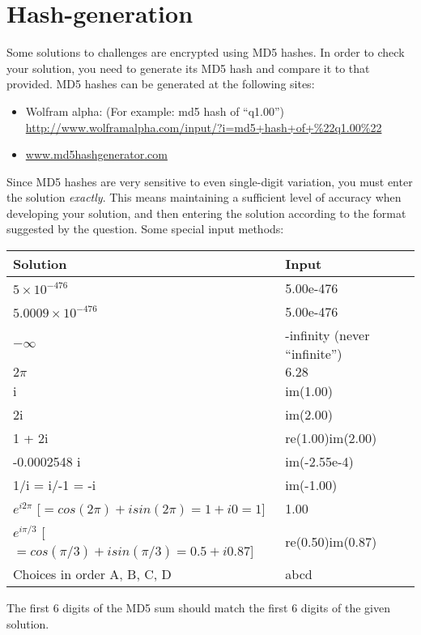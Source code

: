 \newpage
\section{Hash-generation}
\label{sec:hashes}

Some solutions to challenges are encrypted using MD5 hashes. In order to check your solution, you need to generate its MD5 hash and compare it to that provided. MD5 hashes can be generated at the following sites:

\begin{itemize}
    \item Wolfram alpha: (For example: md5 hash of ``q1.00'') \url{http://www.wolframalpha.com/input/?i=md5+hash+of+\%22q1.00\%22}
    \item \url{www.md5hashgenerator.com}
\end{itemize}

Since MD5 hashes are very sensitive to even single-digit variation, you must enter the solution \emph{exactly}. This means maintaining a sufficient level of accuracy when developing your solution, and then entering the solution according to the format suggested by the question. Some special input methods:

\begin{center}
\begin{tabular}{|l|l|}
    \hline
    \textbf{Solution} & \textbf{Input} \\ \hline
    $5 \times 10^{-476}$ & 5.00e-476 \\
    $5.0009 \times 10^{-476}$ & 5.00e-476 \\
    $-\infty$ & -infinity (never ``infinite'')\\
    $2 \pi$ & $6.28$ \\
    i & im(1.00) \\
    2i & im(2.00) \\
    1 + 2i & re(1.00)im(2.00) \\
    -0.0002548 i & im(-2.55e-4) \\
    1/i = i/-1 = -i & im(-1.00) \\
    $e^{i2\pi}$ [$= cos(2 \pi) + isin(2 \pi) = 1 + i0 = 1$] & 1.00 \\
    $e^{i\pi/3}$ [$= cos(\pi/3) + isin(\pi/3) = 0.5 + i 0.87$] & re(0.50)im(0.87) \\
    Choices in order A, B, C, D & abcd \\
    \hline
\end{tabular}
\end{center}

The first 6 digits of the MD5 sum should match the first 6 digits of the given solution.
